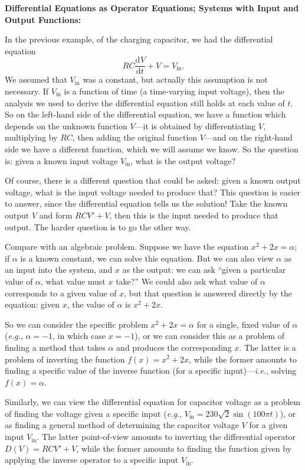 \documentclass{article}
\newcommand{\deriv}[3][]{\frac{\mathrm{d}^{#1}#2}{\mathrm{d}#3^{#1}}}
\begin{document}
\clearpage



\textbf{Differential Equations as Operator Equations; Systems with Input and Output Functions:}\bigskip


In the previous example, of the charging capacitor, we had the differential equation
\[RC\deriv{V}{t} + V = V_\mathrm{in}.\]
We assumed that $V_\mathrm{in}$ was a constant, but actually this assumption is not necessary. If $V_\mathrm{in}$ is a function of time (a time-varying input voltage), then the analysis we used to derive the differential equation still holds at each value of $t$. So on the left-hand side of the differential equation, we have a function which depends on the unknown function $V$---it is obtained by differentiating $V$, multiplying by $RC$, then adding the original function $V$---and on the right-hand side we have a different function, which we will assume we know. So the question is: given a known input voltage $V_\mathrm{in}$, what is the output voltage?

Of course, there is a different question that could be asked: given a known output voltage, what is the input voltage needed to produce that? This question is easier to answer, since the differential equation tells us the solution! Take the known output $V$ and form $RCV'+V$, then this is the input needed to produce that output. The harder question is to go the other way.

Compare with an algebraic problem. Suppose we have the equation $x^2+2x=\alpha$; if $\alpha$ is a known constant, we can solve this equation. But we can also view $\alpha$ as an input into the system, and $x$ as the output: we can ask ``given a particular value of $\alpha$, what value must $x$ take?'' We could also ask what value of $\alpha$ corresponds to a given value of $x$, but that question is answered directly by the equation: given $x$, the value of $\alpha$ is $x^2+2x$.

So we can consider the specific problem $x^2+2x=\alpha$ for a single, fixed value of $\alpha$ (\textit{e.g.}, $\alpha=-1$, in which case $x=-1$), or we can consider this as a problem of finding a method that takes $\alpha$ and produces the corresponding $x$. The latter is a problem of inverting the function $f(x)=x^2+2x$, while the former amounts to finding a specific value of the inverse function (for a specific input)---\textit{i.e.}, solving $f(x)=\alpha$.

Similarly, we can view the differential equation for capacitor voltage as a problem of finding the voltage given a specific input (\textit{e.g.}, $V_\mathrm{in}=230\sqrt{2}\sin(100\pi t)$), or as finding a general method of determining the capacitor voltage $V$ for a given input $V_\mathrm{in}$. The latter point-of-view amounts to inverting the differential operator $D(V)=RCV'+V$, while the former amounts to finding the function given by applying the inverse operator to a specific input $V_\mathrm{in}$.
\end{document}

